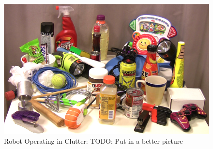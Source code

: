 \begin{figure}[ht!]
	\centering
	\includegraphics[width=\linewidth]{figs/clutter.png}
	\caption{Robot Operating in Clutter: TODO: Put in a better picture}
	\label{fig:intro}
\end{figure}

